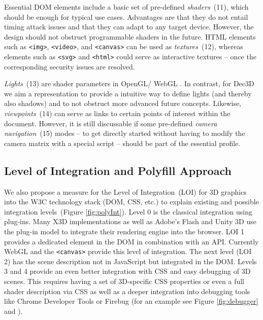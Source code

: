 \documentclass{acmsiggraph}
\begin{document}
Essential DOM elements include a basic set of pre-defined \textit{shaders}~(11), which should be enough for typical use cases. Advantages are that they do not entail timing attack issues and that they can adapt to any target device. However, the design should not obstruct programmable shaders in the future. HTML elements such as \verb|<img>|, \verb|<video>|, and \verb|<canvas>| can be used as \textit{textures}~(12), whereas elements such as \verb|<svg>| and \verb|<html>| could serve as interactive textures -- once the corresponding security issues are resolved.

\textit{Lights}~(13) are shader parameters in OpenGL/ WebGL \cite{WebGL12}. In contrast, for Dec3D we aim a representation to provide a intuitive way to define lights (and thereby also shadows) and to not obstruct more advanced future concepts.
Likewise, \textit{viewpoints}~(14) can serve as links to certain points of interest within the document. However, it is still discussable if some pre-defined \textit{camera navigation}~(15) modes -- to get directly started without having to modify the camera matrix with a special script -- should be part of the essential profile.


\subsection{Level of Integration and Polyfill Approach}
\label{subsection:polyfill}

We also propose a measure for the Level of Integration~(LOI) for 3D graphics into the W3C technology stack (DOM, CSS, etc.) to explain existing and possible integration levels~(Figure \ref{fig:polyInt}). Level 0 is the classical integration using plug-ins. Many X3D implementations as well as Adobe's Flash and Unity 3D use the plug-in model to integrate their rendering engine into the browser. LOI 1 provides a dedicated element in the DOM in combination with an API. Currently  WebGL and the \verb|<canvas>| provide this level of integration. The next level (LOI 2) has the scene description not in JavaScript but integrated in the DOM. Levels 3 and 4 provide an even better integration with CSS and easy debugging of 3D scenes. This requires having a set of 3D-specific CSS properties or even a full shader description via CSS as well as a deeper integration into debugging tools like Chrome Developer Tools or Firebug (for an example see Figure \ref{fig:debugger} and \cite{SonsSlusallekDec3D2012}).
\end{document}
